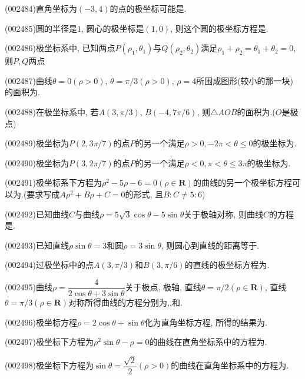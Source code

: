 \item (002484)直角坐标为$(-3,4)$的点的极坐标可能是.
\item (002485)圆的半径是$1$, 圆心的极坐标是$(1,0)$, 则这个圆的极坐标方程是.
\item (002486)极坐标系中, 已知两点$P(\rho_1,\theta_1)$与$Q(\rho_2,\theta_2)$满足$\rho_1+\rho_2=\theta_1+\theta_2=0$, 则$P,Q$两点
\item (002487)曲线$\theta=0(\rho>0)$, $\theta=\pi/3(\rho>0)$, $\rho=4$所围成图形(较小的那一块)的面积为.
\item (002488)在极坐标系中, 若$A(3,\pi/3)$, $B(-4,7\pi/6)$, 则$\triangle AOB$的面积为.($O$是极点)
\item (002489)极坐标为$P(2,3\pi/7)$的点$P$的另一个满足$\rho>0,-2\pi<\theta\le 0$的极坐标为.
\item (002490)极坐标为$P(3,2\pi/7)$的点$P$的另一个满足$\rho<0,\pi<\theta\le3\pi$的极坐标为.
\item (002491)极坐标系下方程为$\rho^2-5\rho-6=0(\rho\in \mathbf{R})$的曲线的另一个极坐标方程可以为.(要求写成$A\rho^2+B\rho+C=0$的形式, 且$B:C\ne 5:6$)
\item (002492)已知曲线$C$与曲线$\rho=5\sqrt{3}\cos\theta-5\sin\theta$关于极轴对称, 则曲线$C$的方程是.
\item (002493)已知直线$\rho \sin\theta=3$和圆$\rho =3\sin\theta$, 则圆心到直线的距离等于.
\item (002494)过极坐标中的点$A(3,\pi/3)$和$B(3,\pi/6)$的直线的极坐标方程为.
\item (002495)曲线$\rho=\dfrac{4}{2\cos\theta+3\sin\theta}$关于极点, 极轴, 直线$\theta=\pi/2(\rho\in \mathbf{R})$, 直线$\theta=\pi/3(\rho\in\mathbf{R})$对称所得曲线的方程分别为,,和.
\item (002496)极坐标方程$\rho=2\cos\theta+\sin\theta$化为直角坐标方程, 所得的结果为.
\item (002497)极坐标下方程为$\rho^2\sin\theta-\rho=0$的曲线在直角坐标系中的方程为.
\item (002498)极坐标下方程为$\sin\theta=\dfrac{\sqrt{2}}{2}(\rho>0)$的曲线在直角坐标系中的方程为.
